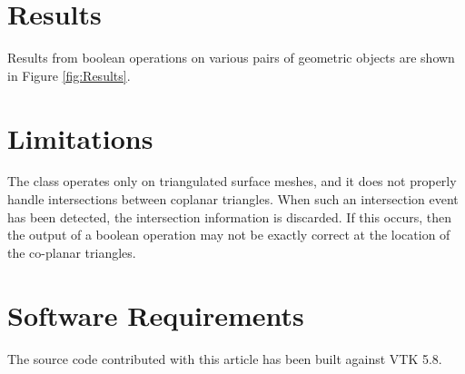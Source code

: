 \documentclass{InsightArticle}
\begin{document}
\section{Results}

Results from boolean operations on various pairs of geometric objects are shown in Figure \ref{fig:Results}.

%

\section{Limitations}

The  class operates only on triangulated surface meshes, and it does not properly handle intersections between coplanar triangles. When such an intersection event has been detected, the intersection information is discarded. If this occurs, then the output of a boolean operation may not be exactly correct at the location of the co-planar triangles.

\section{Software Requirements}

The source code contributed with this article has been built against VTK 5.8.

%
%




%
%



\end{document}
